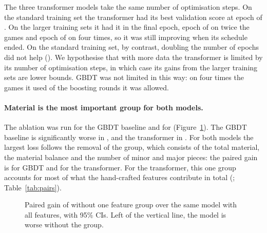 \documentclass[11pt]{article}
\begin{document}
The three transformer models take the same number of optimisation steps. On
the standard training set the transformer had its best validation score at
epoch  of
. On the larger training sets it had it
in the final epoch, epoch 
of  on twice the games and epoch
 of
 on four times, so it was
still improving when its schedule ended.
\ifchangeepochs
On the standard training set, by contrast, doubling the number of epochs did
not help ().
\fi
We hypothesise that with more data the transformer is limited by its number
of optimisation steps, in which case its gains from the larger training sets
are lower bounds. GBDT was not limited in this way: on four times the games
it used  of the 
boosting rounds it was allowed.
\fi



\iffeatures
\paragraph{Material is the most important group for both models.}
The ablation was run for the GBDT baseline and for
 (Figure~\ref{fig:features-transformer}). The
GBDT baseline is significantly worse in
, and the transformer in
. For both models the
largest loss follows the removal of the
 group, which consists of the total
material, the material balance and the number of minor and major pieces: the
paired gain is  for GBDT and
 for the transformer.
For the transformer, this one group accounts for most of what the
hand-crafted features contribute in total
(;
Table~\ref{tab:pairs}).

\begin{figure}[htbp]\centering
{}
\caption{Paired gain of  without one feature
group over the same model with all features, with 95\% CIs. Left of the
vertical line, the model is worse without the group.}
\label{fig:features-transformer}
\end{figure}
\end{document}
